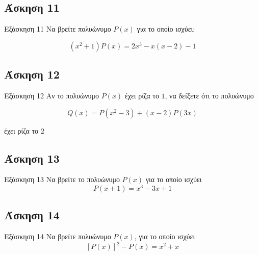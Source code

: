 \documentclass[greek]{beamer}
\begin{document}
\subsection{Άσκηση 11}
\begin{frame}[label=Άσκηση11]{Εξάσκηση 11}
Να βρείτε πολυώνυμο $P(x)$ για το οποίο ισχύει:

$$(x^2+1)P(x)=2x^3-x(x-2)-1$$

\end{frame}

\subsection{Άσκηση 12}
\begin{frame}[label=Άσκηση12]{Εξάσκηση 12}
Αν το πολυώνυμο $P(x)$ έχει ρίζα το $1$, να δείξετε ότι το πολυώνυμο

$$Q(x)=P(x^2-3)+(x-2)P(3x)$$

έχει ρίζα το $2$

\end{frame}

\subsection{Άσκηση 13}
\begin{frame}[label=Άσκηση13]{Εξάσκηση 13}
Να βρείτε το πολυώνυμο $P(x)$ για το οποίο ισχύει
$$P(x+1)=x^3-3x+1$$

\end{frame}

\subsection{Άσκηση 14}
\begin{frame}[label=Άσκηση14]{Εξάσκηση 14}
Να βρείτε πολυώνυμο $P(x)$, για το οποίο ισχύει
$$\left[ P(x) \right]^2-P(x)=x^2+x$$
\end{frame}


%
%
%
%
%
%
%
\end{document}
